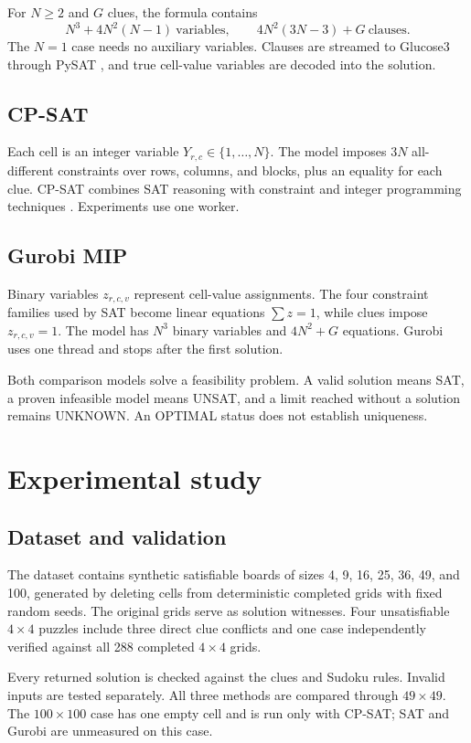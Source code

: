 \documentclass[a4paper,fleqn]{cas-sc}
\begin{document}
For \(N\ge2\) and \(G\) clues, the formula contains
\[
N^3+4N^2(N-1)\ \text{variables},\qquad
4N^2(3N-3)+G\ \text{clauses}.
\]
The \(N=1\) case needs no auxiliary variables. Clauses are streamed to Glucose3 through PySAT \cite{pysat}, and true cell-value variables are decoded into the solution.

\subsection{CP-SAT}
Each cell is an integer variable \(Y_{r,c}\in\{1,\ldots,N\}\). The model imposes \(3N\) all-different constraints over rows, columns, and blocks, plus an equality for each clue. CP-SAT combines SAT reasoning with constraint and integer programming techniques \cite{cpsat}. Experiments use one worker.

\subsection{Gurobi MIP}
Binary variables \(z_{r,c,v}\) represent cell-value assignments. The four constraint families used by SAT become linear equations \(\sum z=1\), while clues impose \(z_{r,c,v}=1\). The model has \(N^3\) binary variables and \(4N^2+G\) equations. Gurobi \cite{gurobi} uses one thread and stops after the first solution.

Both comparison models solve a feasibility problem. A valid solution means SAT, a proven infeasible model means UNSAT, and a limit reached without a solution remains UNKNOWN. An OPTIMAL status does not establish uniqueness.

\section{Experimental study}
\subsection{Dataset and validation}
The dataset contains synthetic satisfiable boards of sizes 4, 9, 16, 25, 36, 49, and 100, generated by deleting cells from deterministic completed grids with fixed random seeds. The original grids serve as solution witnesses. Four unsatisfiable \(4\times4\) puzzles include three direct clue conflicts and one case independently verified against all 288 completed \(4\times4\) grids.

Every returned solution is checked against the clues and Sudoku rules. Invalid inputs are tested separately. All three methods are compared through \(49\times49\). The \(100\times100\) case has one empty cell and is run only with CP-SAT; SAT and Gurobi are unmeasured on this case.
\end{document}
